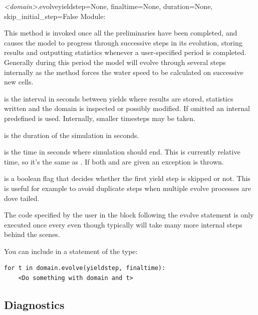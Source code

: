 \documentclass{manual}
\begin{document}
\begin{methoddesc}{\emph{<domain>}.evolve}{yieldstep=None,
                                           finaltime=None,
                                           duration=None,
                                           skip_initial_step=False}
Module: 

This method is invoked once all the
preliminaries have been completed, and causes the model to progress
through successive steps in its evolution, storing results and
outputting statistics whenever a user-specified period
 is completed.  Generally during this period the
model will evolve through several steps internally
as the method forces the water speed to be calculated
on successive new cells. 

 is the interval in seconds between yields where results are
stored, statistics written and the domain is inspected or possibly modified.
If omitted an internal predefined  is used.  Internally, smaller
timesteps may be taken.

 is the duration of the simulation in seconds.

 is the time in seconds where simulation should end. This is currently
relative time, so it's the same as .  If both  and
 are given an exception is thrown.

 is a boolean flag that decides whether the first
yield step is skipped or not. This is useful for example to avoid
duplicate steps when multiple evolve processes are dove tailed.

The code specified by the user in the block following the evolve statement is
only executed once every  even though 
\anuga typically will take many more internal steps behind the scenes.

You can include  in a statement of the type:

\begin{verbatim}
for t in domain.evolve(yieldstep, finaltime):
    <Do something with domain and t>
\end{verbatim}
\end{methoddesc}

\subsection{Diagnostics}
\label{sec:diagnostics}
\end{document}
